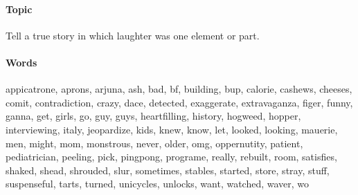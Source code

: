 \documentclass[a4paper,12pt,english]{article}
\begin{document}
\paragraph{Topic} Tell a true story in which laughter was one element or part.
\paragraph{Words}
appicatrone, aprons, arjuna, ash, bad, bf, building, bup, calorie, cashews, cheeses, comit, contradiction, crazy, dace, detected, exaggerate, extravaganza, figer, funny, ganna, get, girls, go, guy, guys, heartfilling, history, hogweed, hopper,  interviewing, italy, jeopardize, kids, knew, know, let, looked, looking, mauerie, men, might, mom, monstrous, never, older, omg, oppernutity, patient, pediatrician, peeling, pick, pingpong, programe, really, rebuilt, room, satisfies, shaked, shead, shrouded, slur, sometimes, stables, started, store, stray, stuff, suspenseful, tarts, turned, unicycles, unlocks, want, watched, waver, wo


 

\end{document}
